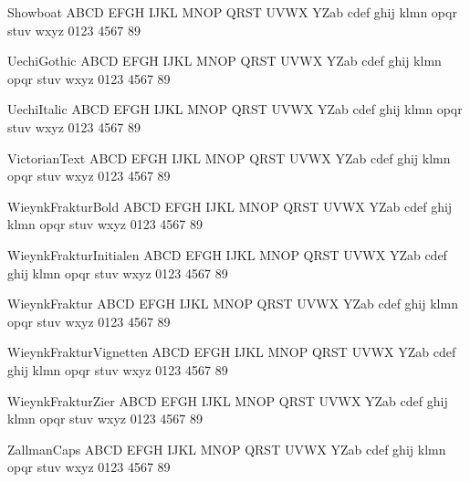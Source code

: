 \documentclass[10pt]{memoir}
\newcommand{\blInitSz}{40}
\begin{document}
Showboat
{\blSetShowboat\fontsize{\blInitSz}{40}\selectfont 
ABCD EFGH IJKL MNOP QRST UVWX YZab cdef ghij klmn opqr stuv wxyz 0123 4567 89
} 

UechiGothic
{\blSetUechiGothic\fontsize{\blInitSz}{40}\selectfont 
ABCD EFGH IJKL MNOP QRST UVWX YZab cdef ghij klmn opqr stuv wxyz 0123 4567 89
} 

UechiItalic
{\blSetUechiItalic\fontsize{\blInitSz}{40}\selectfont 
ABCD EFGH IJKL MNOP QRST UVWX YZab cdef ghij klmn opqr stuv wxyz 0123 4567 89
} 

VictorianText
{\blSetVictorianText\fontsize{\blInitSz}{40}\selectfont 
ABCD EFGH IJKL MNOP QRST UVWX YZab cdef ghij klmn opqr stuv wxyz 0123 4567 89
} 

WieynkFrakturBold
{\blSetWieynkFrakturBold\fontsize{\blInitSz}{40}\selectfont 
ABCD EFGH IJKL MNOP QRST UVWX YZab cdef ghij klmn opqr stuv wxyz 0123 4567 89
} 

WieynkFrakturInitialen
{\blSetWieynkFrakturInitialen\fontsize{\blInitSz}{40}\selectfont 
ABCD EFGH IJKL MNOP QRST UVWX YZab cdef ghij klmn opqr stuv wxyz 0123 4567 89
} 

WieynkFraktur
{\blSetWieynkFraktur\fontsize{\blInitSz}{40}\selectfont 
ABCD EFGH IJKL MNOP QRST UVWX YZab cdef ghij klmn opqr stuv wxyz 0123 4567 89
} 

WieynkFrakturVignetten
{\blSetWieynkFrakturVignetten\fontsize{\blInitSz}{40}\selectfont 
ABCD EFGH IJKL MNOP QRST UVWX YZab cdef ghij klmn opqr stuv wxyz 0123 4567 89
} 

WieynkFrakturZier
{\blSetWieynkFrakturZier\fontsize{\blInitSz}{40}\selectfont 
ABCD EFGH IJKL MNOP QRST UVWX YZab cdef ghij klmn opqr stuv wxyz 0123 4567 89
} 

ZallmanCaps
{\blSetZallmanCaps\fontsize{\blInitSz}{40}\selectfont 
ABCD EFGH IJKL MNOP QRST UVWX YZab cdef ghij klmn opqr stuv wxyz 0123 4567 89
} 
\end{document}
